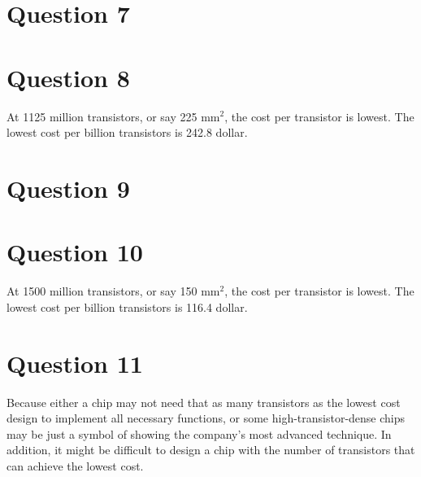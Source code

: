 \documentclass[12pt,letterpaper]{article}
\begin{document}
\section*{Question 7}
\section*{Question 8}
At 1125 million transistors, or say 225 $\mbox{mm}^2$, the cost per 
transistor is lowest. The lowest cost per billion transistors is 242.8 dollar.

\section*{Question 9}
\section*{Question 10}
At 1500 million transistors, or say 150 $\mbox{mm}^2$, the cost per
transistor is lowest. The lowest cost per billion transistors is 116.4 dollar.

\section*{Question 11}
Because either a chip may not need that as many transistors as the lowest 
cost design to implement all necessary functions, or some 
high-transistor-dense chips may be just a symbol of showing the 
company's most advanced technique. In addition, it might be difficult to 
design a chip with the number of transistors that can achieve the lowest 
cost.
\end{document}
